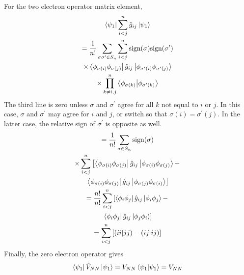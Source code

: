 \documentclass[final,3p,times,twocolumn]{elsarticle}
\begin{document}
\begin{enumerate}
	For the two electron operator matrix element,
	\begin{gather}
	\bra{\psi_1}\sum_{i<j}^n\hat g_{ij}\ket{\psi_1} \\
	\begin{gathered}
	= \frac{1}{n!}\sum_{\sigma\sigma^\prime\in S_n} \sum_{i < j}^n \text{sign}(\sigma)\text{sign}(\sigma^\prime) \\
	\times \bra{\phi_{\sigma(i)}\phi_{\sigma(j)}}\hat g_{ij} \ket{\phi_{\sigma^\prime(i)}\phi_{\sigma^\prime(j)}} \\
	\times \prod_{k \neq i,j}^n \bra{\phi_{\sigma(k)}}\ket{\phi_{\sigma^\prime(k)}}
	\end{gathered}
	\end{gather}
	The third line is zero unless $\sigma$ and $\sigma^\prime$ agree for all $k$ not equal to $i$ or $j$. In this case, $\sigma$ and $\sigma^\prime$ may agree for $i$ and $j$, or switch so that $\sigma(i) = \sigma^\prime(j)$. In the latter case, the relative sign of $\sigma^\prime$ is opposite as well.
	\begin{gather}
	\begin{gathered}
	= \frac{1}{n!} \sum_{\sigma \in S_n} \text{sign}(\sigma) \\ \times \sum_{i < j}^n \left[ \bra{\phi_{\sigma(i)}\phi_{\sigma(j)}}\hat g_{ij} \ket{\phi_{\sigma(i)}\phi_{\sigma(j)}} - \right.\\ \left. \bra{\phi_{\sigma(i)}\phi_{\sigma(j)}}\hat g_{ij} \ket{\phi_{\sigma(j)}\phi_{\sigma(i)}} \right]
	\end{gathered} \\
	\begin{gathered}
	= \frac{n!}{n!} \sum_{i < j}^n \left[ \bra{\phi_i\phi_j}\hat g_{ij} \ket{\phi_i\phi_j} - \right.\\ \left. \bra{\phi_i\phi_j}\hat g_{ij} \ket{\phi_j\phi_i} \right]
	\end{gathered} \\
	= \sum_{i < j}^n \left[ (ii|jj) - (ij|ij) \right]
	\end{gather}
	Finally, the zero electron operator gives
	\begin{equation}
	\bra{\psi_1}\hat V_{NN} \ket{\psi_1} = V_{NN} \bra{\psi_1}\ket{\psi_1} = V_{NN}
	\end{equation}
	

\end{enumerate}
\end{document}
